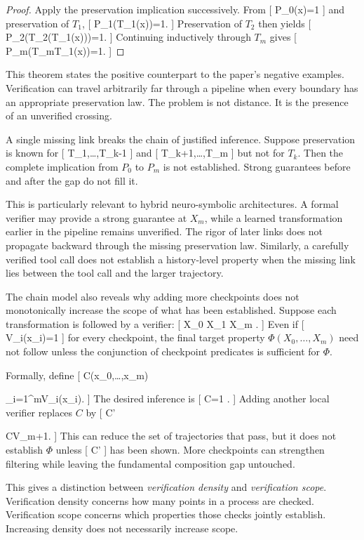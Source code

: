 \documentclass[11pt]{article}
\begin{document}
\begin{proof}
Apply the preservation implication successively. From
[
P_0(x)=1
]
and preservation of $T_1$,
[
P_1(T_1(x))=1.
]
Preservation of $T_2$ then yields
[
P_2(T_2(T_1(x)))=1.
]
Continuing inductively through $T_m$ gives
[
P_m(T_m\circ\cdots\circ T_1(x))=1.
]
\end{proof}

This theorem states the positive counterpart to the paper's negative examples. Verification can travel arbitrarily far through a pipeline when every boundary has an appropriate preservation law. The problem is not distance. It is the presence of an unverified crossing.

A single missing link breaks the chain of justified inference. Suppose preservation is known for
[
T_1,\ldots,T_{k-1}
]
and
[
T_{k+1},\ldots,T_m
]
but not for $T_k$. Then the complete implication from $P_0$ to $P_m$ is not established. Strong guarantees before and after the gap do not fill it.

This is particularly relevant to hybrid neuro-symbolic architectures. A formal verifier may provide a strong guarantee at $X_m$, while a learned transformation earlier in the pipeline remains unverified. The rigor of later links does not propagate backward through the missing preservation law. Similarly, a carefully verified tool call does not establish a history-level property when the missing link lies between the tool call and the larger trajectory.

The chain model also reveals why adding more checkpoints does not monotonically increase the scope of what has been established. Suppose each transformation is followed by a verifier:
[
X_0
X_1
\cdots
{}
X_m
.
]
Even if
[
V_i(x_i)=1
]
for every checkpoint, the final target property $\Phi(X_0,\ldots,X_m)$ need not follow unless the conjunction of checkpoint predicates is sufficient for $\Phi$.

Formally, define
[
C(x_0,\ldots,x_m)

\bigwedge_{i=1}^{m}V_i(x_i).
]
The desired inference is
[
C=1
\Longrightarrow
{}.
]
Adding another local verifier replaces $C$ by
[
C'

C\land V_{m+1}.
]
This can reduce the set of trajectories that pass, but it does not establish $\Phi$ unless
[
C'\Rightarrow\Phi
]
has been shown. More checkpoints can strengthen filtering while leaving the fundamental composition gap untouched.

This gives a distinction between \emph{verification density} and \emph{verification scope}. Verification density concerns how many points in a process are checked. Verification scope concerns which properties those checks jointly establish. Increasing density does not necessarily increase scope.
\end{document}
